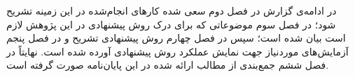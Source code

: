 در ادامه‌ی گزارش در فصل دوم سعی شده کارهای انجام‌شده در این زمینه تشریح شود؛ در فصل سوم موضوعاتی که برای درک روش پیشنهادی در این پژوهش لازم است بیان شده است؛ سپس در فصل چهارم روش پیشنهادی تشریح و در فصل پنجم آزمایش‌های موردنیاز جهت نمایش عملکرد روش پیشنهادی آورده شده است. نهایتاً در فصل ششم جمع‌بندی از مطالب ارائه شده در این پایان‌نامه صورت گرفته است.

